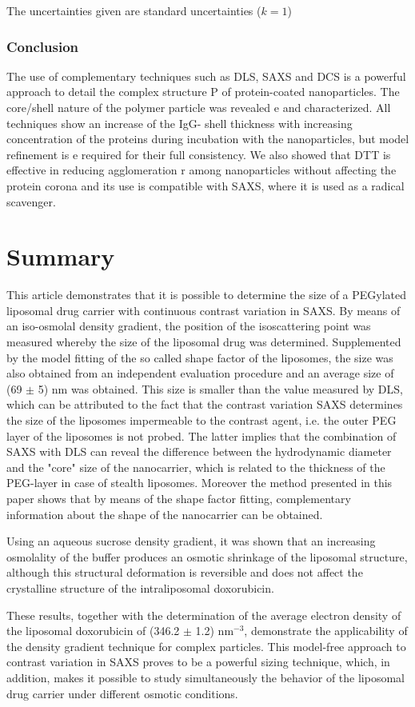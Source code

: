 The uncertainties given are standard uncertainties ($k = 1$)

\subsubsection{Conclusion}

The use of complementary techniques such as DLS, SAXS and DCS is a powerful approach to detail the complex structure P of protein-coated nanoparticles. The core/shell nature of the polymer particle was revealed e  and characterized. All techniques show an increase of the IgG- shell thickness with increasing concentration of the proteins during incubation with the nanoparticles, but model refinement is e required for their full consistency. We also showed that DTT is effective in reducing agglomeration r  among nanoparticles without affecting the protein corona and its use is compatible with SAXS, where it is used as a radical scavenger.


\section{Summary}
This article demonstrates that it is possible to determine the size of a PEGylated liposomal drug carrier with continuous contrast variation in SAXS. By means of an iso-osmolal density gradient, the position of the isoscattering point was measured whereby the size of the liposomal drug was determined. Supplemented by the model fitting of the so called shape factor of the liposomes, the size was also obtained from an independent evaluation procedure and an average size of (69 $\pm$ 5) nm was obtained. This size is smaller than the value measured by DLS, which can be attributed to the fact that the contrast variation SAXS determines the size of the liposomes impermeable to the contrast agent, i.e. the outer PEG layer of the liposomes is not probed. The latter implies that the combination of SAXS with DLS can reveal the difference between the hydrodynamic diameter and the "core" size of the nanocarrier, which is related to the thickness of the PEG-layer in case of stealth liposomes. Moreover the method presented in this paper shows that by means of the shape factor fitting, complementary information about the shape of the nanocarrier can be obtained.

Using an aqueous sucrose density gradient, it was shown that an increasing osmolality of the buffer produces an osmotic shrinkage of the liposomal structure, although this structural deformation is reversible and does not affect the crystalline structure of the intraliposomal doxorubicin.

These results, together with the determination of the average electron density of the liposomal doxorubicin of (346.2 $\pm$ 1.2) nm$^{-3}$, demonstrate the applicability of the density gradient technique for complex particles. This model-free approach to contrast variation in SAXS proves to be a powerful sizing technique, which, in addition, makes it possible to study simultaneously the behavior of the liposomal drug carrier under different osmotic conditions.

